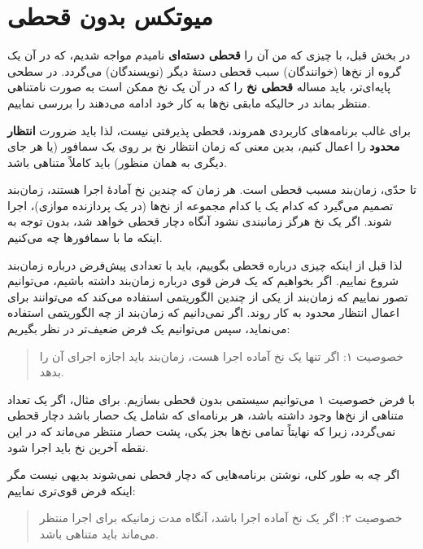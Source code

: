 \documentclass{book}
\newcommand{\clearemptydoublepage}{\newpage\cleardoublepage}
\begin{document}
\clearemptydoublepage
\section{میوتکس بدون قحطی}
\label{props}

    در بخش قبل، با چیزی که من آن را \textbf{قحطی دسته‌ای} نامیدم مواجه شدیم، که در آن یک گروه از نخ‌ها (خوانندگان) 
    سبب قحطی دستهٔ دیگر (نویسندگان) می‌گردد. در سطحی پایه‌ای‌تر،‌ باید مساله \textbf{قحطی نخ} را که در آن یک نخ ممکن است به صورت نامتناهی منتظر بماند در حالیکه مابقی نخ‌ها به کار خود ادامه می‌دهند را بررسی نماییم.
    
    
    برای غالب برنامه‌های کاربردی همروند، قحطی پذیرفتی نیست، لذا باید ضرورت \textbf{انتظار محدود}
    را اعمال کنیم، بدین معنی که زمان انتظار نخ بر روی یک سمافور (یا هر جای دیگری به همان منظور) باید کاملاً متناهی باشد. 

    تا حدّی، زمان‌بند مسبب قحطی است. هر زمان که چندین نخ آمادهٔ اجرا هستند، زمان‌بند تصمیم می‌گیرد که کدام یک یا 
     کدام مجموعه از نخ‌ها (در یک پردازنده موازی)، اجرا شوند. اگر یک نخ هرگز زمانبندی نشود آنگاه دچار قحطی خواهد شد، بدون توجه به اینکه ما با سمافورها چه می‌کنیم. 

    لذا قبل از اینکه چیزی درباره قحطی بگوییم،‌ باید با تعدادی پیش‌فرض درباره زمان‌بند شروع نماییم. 
    اگر بخواهیم که یک فرض قوی درباره زمان‌بند داشته باشیم، 
    می‌توانیم تصور نماییم که زمان‌بند از یکی از چندین الگوریتمی  استفاده می‌‌کند که می‌توانند برای اعمال انتظار محدود به کار روند. 
    اگر نمی‌دانیم که زمان‌بند از چه الگوریتمی استفاده می‌نماید، سپس می‌توانیم یک فرض ضعیف‌تر در نظر بگیریم:

\begin{quote}
    خصوصیت ۱: اگر تنها یک نخ آماده اجرا هست، زمان‌بند باید اجازه اجرای آن را بدهد. 
\end{quote}

    با فرض خصوصیت ۱ می‌توانیم سیستمی بدون قحطی بسازیم. 
    برای مثال، اگر یک تعداد متناهی از نخ‌ها وجود داشته باشد، هر برنامه‌ای که شامل یک حصار باشد دچار قحطی نمی‌گردد، زیرا که 
    نهایتاً تمامی نخ‌ها بجز یکی، پشت حصار منتظر می‌ماند که در این نقطه آخرین نخ باید اجرا شود. 

    اگر چه به طور کلی، نوشتن برنامه‌هایی که دچار قحطی نمی‌شوند بدیهی نیست مگر اینکه فرض قوی‌تری نماییم:

\begin{quote}
    خصوصیت ۲: اگر یک نخ آماده اجرا باشد، آنگاه مدت زمانیکه برای اجرا منتظر می‌ماند باید متناهی باشد. 
\end{quote}
\end{document}
